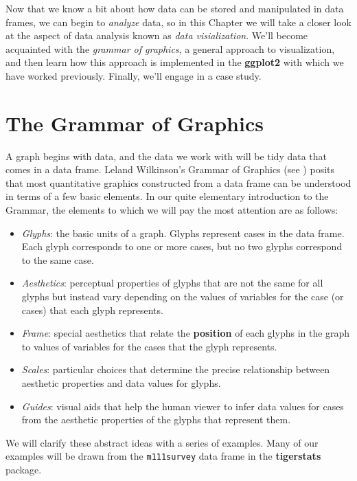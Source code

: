 \documentclass[]{book}
\providecommand{\tightlist}{%
  \setlength{\itemsep}{0pt}\setlength{\parskip}{0pt}}
\theoremstyle{definition}
\theoremstyle{definition}
\theoremstyle{definition}
\theoremstyle{remark}
\begin{document}
{Now that we know a bit about how data can be stored and manipulated in
data frames, we can begin to \emph{analyze} data, so in this Chapter we
will take a closer look at the aspect of data analysis known as
\emph{data visialization}. We'll become acquainted with the
\emph{grammar of graphics}, a general approach to visualization, and
then learn how this approach is implemented in the \textbf{ggplot2} with
which we have worked previously. Finally, we'll engage in a case study.

\section{The Grammar of Graphics}\label{the-grammar-of-graphics}

A graph begins with data, and the data we work with will be tidy data
that comes in a data frame. Leland Wilkinson's Grammar of Graphics (see
\citep{Wilkinson2005}) posits that most quantitative graphics
constructed from a data frame can be understood in terms of a few basic
elements. In our quite elementary introduction to the Grammar, the
elements to which we will pay the most attention are as follows:

\begin{itemize}
\tightlist
\item
  \emph{Glyphs}: the basic units of a graph. Glyphs represent cases in
  the data frame. Each glyph corresponds to one or more cases, but no
  two glyphs correspond to the same case.
\item
  \emph{Aesthetics}: perceptual properties of glyphs that are not the
  same for all glyphs but instead vary depending on the values of
  variables for the case (or cases) that each glyph represents.
\item
  \emph{Frame}: special aesthetics that relate the \textbf{position} of
  each glyphs in the graph to values of variables for the cases that the
  glyph represents.
\item
  \emph{Scales}: particular choices that determine the precise
  relationship between aesthetic properties and data values for glyphs.
\item
  \emph{Guides}: visual aids that help the human viewer to infer data
  values for cases from the aesthetic properties of the glyphs that
  represent them.
\end{itemize}

We will clarify these abstract ideas with a series of examples. Many of
our examples will be drawn from the \texttt{m111survey} data frame in
the \textbf{tigerstats} package.

}
\end{document}
